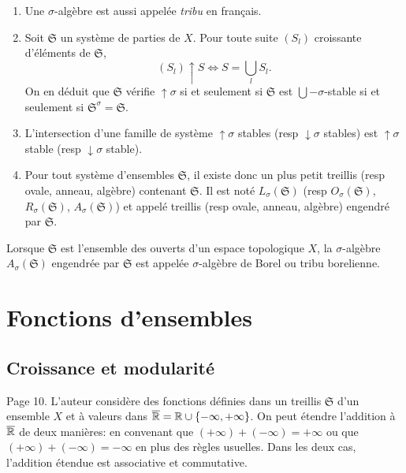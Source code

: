 \begin{rems}
\begin{enumerate}
 \item Une $\sigma$-algèbre est aussi appelée \emph{tribu} en français.
 \item Soit $\mathfrak{S}$ un système de parties de $X$. Pour toute suite $(S_l)$ croissante d'éléments de $\mathfrak{S}$,
   \begin{displaymath}
     (S_l)\uparrow S \Leftrightarrow  S = \bigcup_l S_l.
   \end{displaymath}
  On en déduit que $\mathfrak{S}$ vérifie $\uparrow \sigma$ si et seulement si $\mathfrak{S}$ est $\bigcup - \sigma$-stable si et seulement si $\mathfrak{S}^\sigma = \mathfrak{S}$.
 \item L'intersection d'une famille de système $\uparrow \sigma$ stables (resp $\downarrow \sigma$ stables) est $\uparrow \sigma$ stable (resp $\downarrow \sigma$ stable).
 \item Pour tout système d'ensembles $\mathfrak{S}$, il existe donc un plus petit treillis (resp ovale, anneau, algèbre) contenant $\mathfrak{S}$. Il est noté $L_\sigma(\mathfrak{S})$ (resp $O_\sigma(\mathfrak{S})$, $R_\sigma(\mathfrak{S})$, $A_\sigma(\mathfrak{S})$) et appelé treillis (resp ovale, anneau, algèbre) engendré par $\mathfrak{S}$.
\end{enumerate}
\end{rems}
\begin{exple}
Lorsque $\mathfrak{S}$ est l'ensemble des ouverts d'un espace topologique $X$, la $\sigma$-algèbre $A_\sigma(\mathfrak{S})$ engendrée par $\mathfrak{S}$ est appelée $\sigma$-algèbre de Borel ou tribu borelienne.
\end{exple}


\section{Fonctions d'ensembles}\label{Sec:FoncEns}
\subsection{Croissance et modularité}
Page 10. L'auteur considère des fonctions définies dans un treillis $\mathfrak{S}$ d'un ensemble $X$ et à valeurs dans $\overline{\mathbb{R}}= \mathbb{R} \cup\{- \infty, + \infty\} $. On peut étendre l'addition à $\overline{\mathbb{R}}$ de deux manières: en convenant que $(+ \infty) + (-\infty) = + \infty$ ou que $(+ \infty) + (-\infty) = - \infty$ en plus des règles usuelles. Dans les deux cas, l'addition étendue est associative et commutative.

